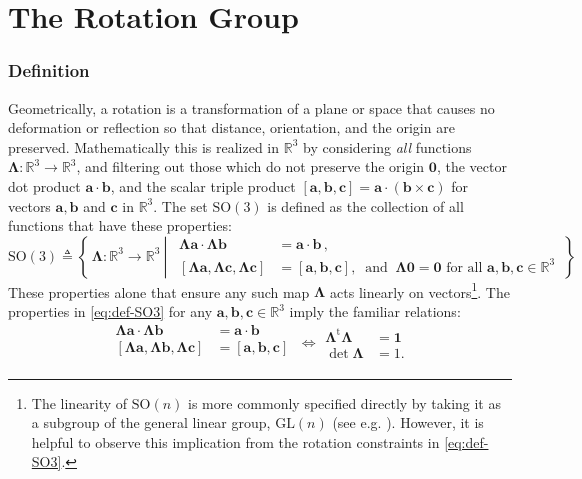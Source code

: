 
\chapter{The Rotation Group}\label{sec:rotations}

\subsection{Definition}\label{definition}

Geometrically, a rotation is a transformation of a plane or space that causes no
deformation or reflection so that distance, orientation, and the origin
are preserved. Mathematically this is realized in \(\mathbb{R}^3\) by
considering \emph{all} functions
\(\bm{\Lambda}\colon \mathbb{R}^3\rightarrow \mathbb{R}^3\), and
filtering out those which do not preserve the origin \(\bm{0}\),
the vector dot product \(\bm{a}\cdot \bm{b}\),
and the scalar triple product
\([\bm{a},\bm{b},\bm{c}] = \bm{a}\cdot\left(\bm{b}\times\bm{c}\right)\)
for vectors \(\bm{a},\bm{b}\) and \(\bm{c}\) in \(\mathbb{R}^3\). The
set \(\mathrm{SO}(3)\) is defined as the collection of all functions
that have these properties: %
\begin{equation}
\mathrm{SO}(3) \triangleq \left\{\,
    \bm{\Lambda}\colon \mathbb{R}^3\rightarrow\mathbb{R}^3
~\left|~~
\begin{aligned}
\bm{\Lambda}\bm{a}\cdot\bm{\Lambda}\bm{b} &= \bm{a}\cdot\bm{b}\,
,  \\
[\bm{\Lambda}\bm{a}, \bm{\Lambda}\bm{c}, \bm{\Lambda}\bm{c}]&=[\bm{a}, \bm{b}, \bm{c}]
,~\text{ and } ~\bm{\Lambda}\bm{0} = \bm{0}
\text{ for all }\bm{a},\bm{b},\bm{c}\in\mathbb{R}^3
\end{aligned}
\right.
\,\right\}
\label{eq:def-SO3}\end{equation}
These properties alone that ensure any such map \(\bm{\Lambda}\) acts linearly on vectors\footnote{The linearity of $\mathrm{SO}(n)$ is more commonly specified directly by taking it as a subgroup of the general linear group, $\mathrm{GL}(n)$ (see e.g. \cite{artin1991algebra}).
However, it is helpful to observe this implication from the rotation constraints in \eqref{eq:def-SO3}.}. 
The properties in \eqref{eq:def-SO3} for any 
\(\bm{a},\bm{b},\bm{c}\in\mathbb{R}^3\)
imply the familiar relations:
\begin{equation*} 
\begin{aligned}
\bm{\Lambda}\bm{a}\cdot\bm{\Lambda}\bm{b} &= \bm{a}\cdot\bm{b}\,
  \\
[\bm{\Lambda a}, \bm{\Lambda b}, \bm{\Lambda c}]&=[\bm{a}, \bm{b}, \bm{c}] \\
\end{aligned} \ \Longleftrightarrow
\begin{aligned}
\bm{\Lambda}^{\mathrm{t}} \bm{\Lambda}&=\mathbf{1} \\
\det\bm{\Lambda} &= 1 .
\end{aligned}
\end{equation*}

